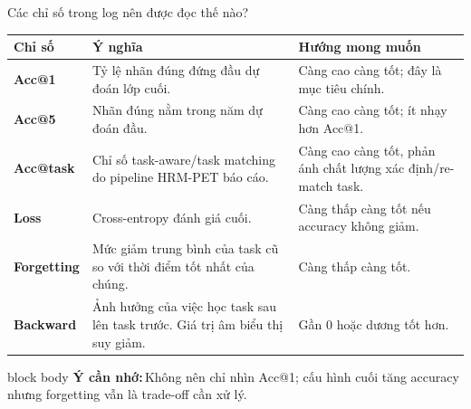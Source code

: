 \documentclass[aspectratio=169,10pt]{beamer}
\newcommand{\remember}[1]{%
  \par\vspace{0.12cm}%
  \begin{beamercolorbox}[wd=\linewidth,sep=0.11cm,leftskip=0.08cm,rightskip=0.08cm,rounded=true]{block body}
    \footnotesize\textbf{\color{HRMBlue}Ý cần nhớ:}\,\color{HRMDark}#1
  \end{beamercolorbox}
}
\begin{document}
\begin{frame}{Các chỉ số trong log nên được đọc thế nào?}
  \small
  \begin{tabularx}{\textwidth}{>{\bfseries}p{2.25cm} X p{4.2cm}}
    \toprule
    Chỉ số & Ý nghĩa & Hướng mong muốn \\
    \midrule
    Acc@1 & Tỷ lệ nhãn đúng đứng đầu dự đoán lớp cuối. & Càng cao càng tốt; đây là mục tiêu chính. \\
    Acc@5 & Nhãn đúng nằm trong năm dự đoán đầu. & Càng cao càng tốt; ít nhạy hơn Acc@1. \\
    Acc@task & Chỉ số task-aware/task matching do pipeline HRM-PET báo cáo. & Càng cao càng tốt, phản ánh chất lượng xác định/re-match task. \\
    Loss & Cross-entropy đánh giá cuối. & Càng thấp càng tốt nếu accuracy không giảm. \\
    Forgetting & Mức giảm trung bình của task cũ so với thời điểm tốt nhất của chúng. & Càng thấp càng tốt. \\
    Backward & Ảnh hưởng của việc học task sau lên task trước. Giá trị âm biểu thị suy giảm. & Gần 0 hoặc dương tốt hơn. \\
    \bottomrule
  \end{tabularx}
  \remember{Không nên chỉ nhìn Acc@1; cấu hình cuối tăng accuracy nhưng forgetting vẫn là trade-off cần xử lý.}
\end{frame}
\end{document}
